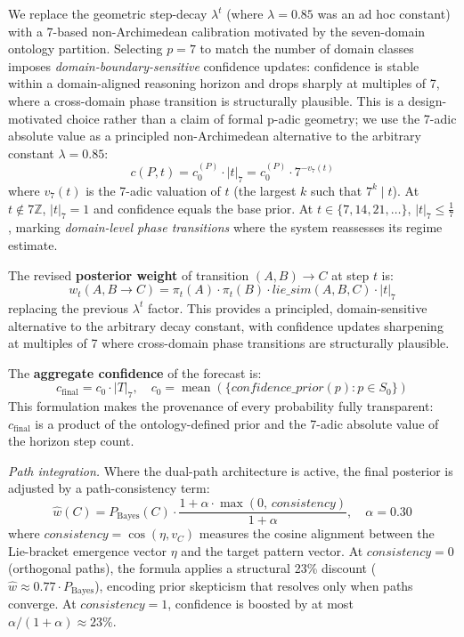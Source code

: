 \documentclass{llncs}
\begin{document}
We replace the geometric step-decay $\lambda^t$ (where $\lambda = 0.85$ was
an ad hoc constant) with a 7-based non-Archimedean calibration motivated by
the seven-domain ontology partition. Selecting $p = 7$ to match the number of
domain classes imposes \emph{domain-boundary-sensitive} confidence updates:
confidence is stable within a domain-aligned reasoning horizon and drops sharply
at multiples of 7, where a cross-domain phase transition is structurally
plausible. This is a design-motivated choice rather than a claim of formal
p-adic geometry; we use the 7-adic absolute value as a principled
non-Archimedean alternative to the arbitrary constant $\lambda = 0.85$:
\[
  c(P, t) = c_0^{(P)} \cdot |t|_7 = c_0^{(P)} \cdot 7^{-v_7(t)}
\]
where $v_7(t)$ is the 7-adic valuation of $t$ (the largest $k$ such that
$7^k \mid t$). At $t \notin 7\mathbb{Z}$, $|t|_7 = 1$ and confidence equals
the base prior. At $t \in \{7, 14, 21, \ldots\}$, $|t|_7 \leq \tfrac{1}{7}$,
marking \emph{domain-level phase transitions} where the system reassesses its
regime estimate.

The revised \textbf{posterior weight} of transition $(A, B) \to C$ at step $t$ is:
\[
  w_t(A, B \to C)
    = \pi_t(A) \cdot \pi_t(B) \cdot \mathit{lie\_sim}(A, B, C) \cdot |t|_7
\]
replacing the previous $\lambda^t$ factor. This provides a principled,
domain-sensitive alternative to the arbitrary decay constant, with confidence
updates sharpening at multiples of 7 where cross-domain phase transitions are
structurally plausible.

The \textbf{aggregate confidence} of the forecast is:
\[
  c_{\mathrm{final}} = c_0 \cdot |T|_7,
  \quad
  c_0 = \operatorname{mean}(\{\mathit{confidence\_prior}(p) : p \in S_0\})
\]
This formulation makes the provenance of every probability fully
transparent: $c_{\mathrm{final}}$ is a product of the ontology-defined prior
and the 7-adic absolute value of the horizon step count.

\textit{Path integration.} Where the dual-path architecture is active,
the final posterior is adjusted by a path-consistency term:
\[
  \hat{w}(C)
    = P_{\mathrm{Bayes}}(C)
      \cdot \frac{1 + \alpha \cdot \max(0,\, \mathit{consistency})}{1 + \alpha},
  \quad \alpha = 0.30
\]
where $\mathit{consistency} = \cos(\eta, v_C)$ measures the cosine alignment
between the Lie-bracket emergence vector $\eta$ and the target pattern
vector. At $\mathit{consistency} = 0$ (orthogonal paths), the formula applies
a structural 23\% discount ($\hat{w} \approx 0.77 \cdot P_{\mathrm{Bayes}}$),
encoding prior skepticism that resolves only when paths converge. At
$\mathit{consistency} = 1$, confidence is boosted by at most
$\alpha / (1 + \alpha) \approx 23\%$.
\end{document}
